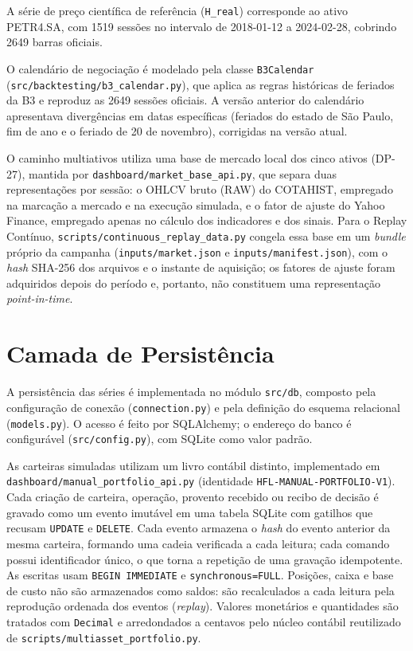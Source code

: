 \documentclass{eic-bcc-tcc}
\begin{document}
A série de preço científica de referência (\texttt{H\_real}) corresponde ao ativo PETR4.SA, com 1519 sessões no intervalo de 2018-01-12 a 2024-02-28, cobrindo 2649 barras oficiais.

O calendário de negociação é modelado pela classe \texttt{B3Calendar} (\texttt{src/backtesting/b3\_calendar.py}), que aplica as regras históricas de feriados da B3 e reproduz as 2649 sessões oficiais. A versão anterior do calendário apresentava divergências em datas específicas (feriados do estado de São Paulo, fim de ano e o feriado de 20 de novembro), corrigidas na versão atual.

O caminho multiativos utiliza uma base de mercado local dos cinco ativos (DP-27), mantida por \texttt{dashboard/market\_base\_api.py}, que separa duas representações por sessão: o OHLCV bruto (RAW) do COTAHIST, empregado na marcação a mercado e na execução simulada, e o fator de ajuste do Yahoo Finance, empregado apenas no cálculo dos indicadores e dos sinais. Para o Replay Contínuo, \texttt{scripts/continuous\_replay\_data.py} congela essa base em um \textit{bundle} próprio da campanha (\texttt{inputs/market.json} e \texttt{inputs/manifest.json}), com o \textit{hash} SHA-256 dos arquivos e o instante de aquisição; os fatores de ajuste foram adquiridos depois do período e, portanto, não constituem uma representação \textit{point-in-time}.

\section{Camada de Persistência}

A persistência das séries é implementada no módulo \texttt{src/db}, composto pela configuração de conexão (\texttt{connection.py}) e pela definição do esquema relacional (\texttt{models.py}). O acesso é feito por SQLAlchemy; o endereço do banco é configurável (\texttt{src/config.py}), com SQLite como valor padrão.

As carteiras simuladas utilizam um livro contábil distinto, implementado em \texttt{dashboard/manual\_portfolio\_api.py} (identidade \texttt{HFL-MANUAL-PORTFOLIO-V1}). Cada criação de carteira, operação, provento recebido ou recibo de decisão é gravado como um evento imutável em uma tabela SQLite com gatilhos que recusam \texttt{UPDATE} e \texttt{DELETE}. Cada evento armazena o \textit{hash} do evento anterior da mesma carteira, formando uma cadeia verificada a cada leitura; cada comando possui identificador único, o que torna a repetição de uma gravação idempotente. As escritas usam \texttt{BEGIN IMMEDIATE} e \texttt{synchronous=FULL}. Posições, caixa e base de custo não são armazenados como saldos: são recalculados a cada leitura pela reprodução ordenada dos eventos (\textit{replay}). Valores monetários e quantidades são tratados com \texttt{Decimal} e arredondados a centavos pelo núcleo contábil reutilizado de \texttt{scripts/multiasset\_portfolio.py}.
\end{document}
